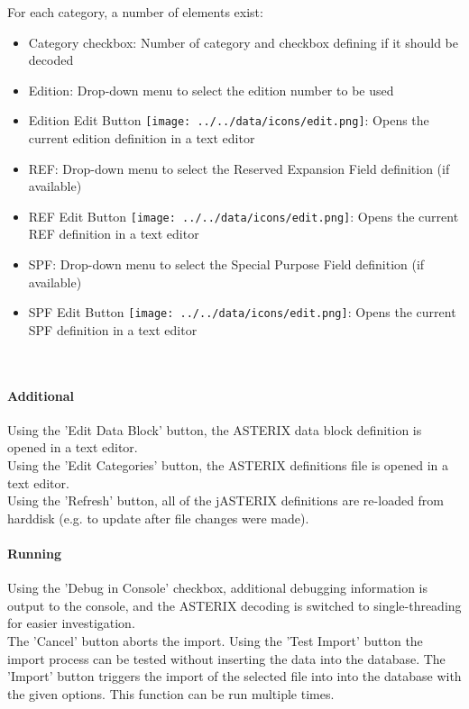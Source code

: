 For each category, a number of elements exist:

\begin{itemize}
\item Category checkbox: Number of category and checkbox defining if it should be decoded
\item Edition: Drop-down menu to select the edition number to be used
\item Edition Edit Button \texttt{[image: ../../data/icons/edit.png]}: Opens the current edition definition in a text editor
\item REF: Drop-down menu to select the Reserved Expansion Field definition (if available)
\item REF Edit Button \texttt{[image: ../../data/icons/edit.png]}: Opens the current REF definition in a text editor
\item SPF: Drop-down menu to select the Special Purpose Field definition (if available)
\item SPF Edit Button \texttt{[image: ../../data/icons/edit.png]}: Opens the current SPF definition in a text editor
\end{itemize}
\ \\

\paragraph{Additional}

Using the 'Edit Data Block' button, the ASTERIX data block definition is opened in a text editor. \\

Using the 'Edit Categories' button, the ASTERIX definitions file is opened in a text editor. \\

Using the 'Refresh' button, all of the jASTERIX definitions are re-loaded from harddisk (e.g. to update after file changes were made). \\



\paragraph{Running}
Using the 'Debug in Console' checkbox, additional debugging information is output to the console, and the ASTERIX decoding is switched to single-threading for easier investigation. \\

The 'Cancel' button aborts the import. Using the 'Test Import' button the import process can be tested without inserting the data into the database. 
The 'Import' button triggers the import of the selected file into into the database with the given options. This function can be run multiple times. \\

